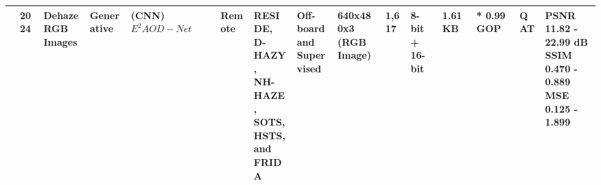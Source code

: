 \begin{center}
{\begin{tabular}{lllllllllllllll}
\cite{zhangEnergyefficientDehazingNeural2024} & 2024 & \makecell[tl]{Dehaze RGB\\ Images} & Generative & \makecell[tl]{(CNN)\\ $E^2AOD-Net$} & Remote & \makecell[tl]{RESIDE,\\ D-HAZY,\\ NH-HAZE,\\ SOTS,\\ HSTS,\\ and FRIDA} & \makecell[tl]{Off-board\\ and\\ Supervised} & \makecell[tl]{640x480x3\\ (RGB Image)} & 1,617 & \makecell[tl]{8-bit +\\ 16-bit} & 1.61 KB & * 0.99 GOP & QAT & \makecell[tl]{PSNR\\ 11.82 - 22.99 dB\\ SSIM\\ 0.470 - 0.889\\ MSE\\ 0.125 - 1.899}  \\ \hline

\end{tabular}}
\end{center}
